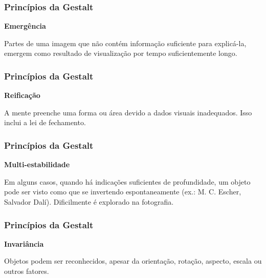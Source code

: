 \begin{frame}
    \frametitle{Princípios da Gestalt}
    {\textbf{\large Emergência}}
    \vspace{1cm}

    Partes de uma imagem que não contém informação suficiente para explicá-la,
    emergem como resultado de visualização por tempo suficientemente longo.
\end{frame}

\begin{frame}
  \frametitle{Princípios da Gestalt}
  {\textbf{\large Reificação}}
  \vspace{1cm}

  A mente preenche uma forma ou área devido a dados visuais inadequados. Isso
  inclui a lei de fechamento.
\end{frame}

\begin{frame}
  \frametitle{Princípios da Gestalt}
  {\textbf{\large Multi-estabilidade}}
  \vspace{1cm}

  Em alguns casos, quando há indicações suficientes de profundidade, um objeto
  pode ser visto como que se invertendo espontaneamente (ex.: M. C. Escher,
  Salvador Dalí). Dificilmente é explorado na fotografia.
\end{frame}

\begin{frame}
  \frametitle{Princípios da Gestalt}
  {\textbf{\large Invariância}}
  \vspace{1cm}

  Objetos podem ser reconhecidos, apesar da orientação, rotação, aspecto, escala
  ou outros fatores.
\end{frame}







